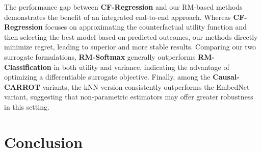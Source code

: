 \documentclass{article}
\theoremstyle{remark}
\begin{document}
The performance gap between \textbf{CF-Regression} and our RM-based methods demonstrates the benefit of an integrated end-to-end approach. Whereas \textbf{CF-Regression} focuses on approximating the counterfactual utility function and then selecting the best model based on predicted outcomes, our methods directly minimize regret, leading to superior and more stable results.
Comparing our two surrogate formulations, \textbf{RM-Softmax} generally outperforms \textbf{RM-Classification} in both utility and variance, indicating the advantage of optimizing a differentiable surrogate objective. Finally, among the \textbf{Causal-CARROT} variants, the {kNN} version consistently outperforms the EmbedNet variant, suggesting that non-parametric estimators may offer greater robustness in this setting.




\section{Conclusion}
\end{document}
